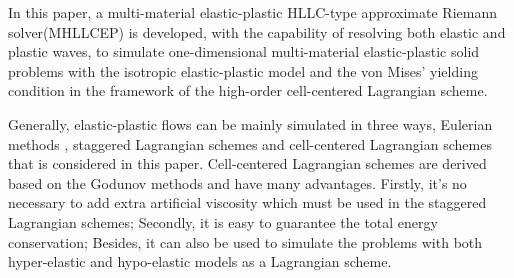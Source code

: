 \documentclass{article}
\numberwithin{equation}{section}
\numberwithin{table}{section}
\begin{document}
In this paper, a multi-material elastic-plastic HLLC-type approximate Riemann solver(MHLLCEP) is developed, with the capability of resolving both elastic and plastic waves, to simulate one-dimensional  multi-material elastic-plastic solid problems with the isotropic elastic-plastic model \cite{wilkins1963calculation} and  the von Mises' yielding condition in the framework of the  high-order cell-centered Lagrangian scheme.

Generally, elastic-plastic flows can be mainly simulated in three ways, Eulerian methods \cite{trangenstein1991higher,miller2001high,barton2009exact}, staggered Lagrangian schemes \cite{wilkins1963calculation} and cell-centered Lagrangian schemes \cite{burton2013cell,kluth2010discretization,maire2013nominally,cheng2017third} that  is considered in this paper.
Cell-centered Lagrangian  schemes  are derived  based on the Godunov methods and have  many advantages. Firstly, it's no necessary to add  extra artificial viscosity  which  must be used in the staggered Lagrangian schemes; Secondly, it is easy to guarantee the total energy conservation; Besides, it can also be used to simulate the problems with both  hyper-elastic and hypo-elastic models  \cite{burton2013cell,kluth2010discretization,maire2013nominally,cheng2017third}  as a Lagrangian scheme.
\end{document}
